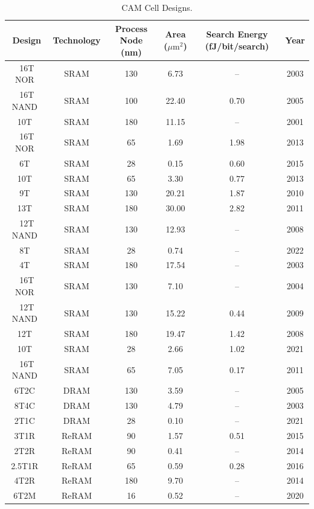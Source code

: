\begin{table}[t]
\small
\caption{CAM Cell Designs.}
\label{tab:cam_cell_designs}
\centering
\begin{tabular}{cccccc}
\hline
Design & Technology & Process Node (nm) & Area ($\mu\mathrm{m}^2$) & Search Energy (fJ/bit/search) & Year \\ \hline
16T NOR~\cite{SRAM_1} & SRAM & 130 & 6.73 & -- & 2003 \\
16T NAND~\cite{SRAM_2} & SRAM & 100 & 22.40 & 0.70 & 2005 \\
10T~\cite{SRAM_3} & SRAM & 180 & 11.15 & -- & 2001 \\
16T NOR~\cite{SRAM_4} & SRAM & 65 & 1.69 & 1.98 & 2013 \\
6T~\cite{SRAM_5} & SRAM & 28 & 0.15 & 0.60 & 2015 \\
10T~\cite{SRAM_6} & SRAM & 65 & 3.30 & 0.77 & 2013 \\
9T~\cite{SRAM_7} & SRAM & 130 & 20.21 & 1.87 & 2010 \\
13T~\cite{SRAM_8} & SRAM & 180 & 30.00 & 2.82 & 2011 \\
12T NAND~\cite{SRAM_9} & SRAM & 130 & 12.93 & -- & 2008 \\
8T~\cite{SRAM_10} & SRAM & 28 & 0.74 & -- & 2022 \\
4T~\cite{SRAM_11} & SRAM & 180 & 17.54 & -- & 2003 \\
16T NOR~\cite{SRAM_12} & SRAM & 130 & 7.10 & -- & 2004 \\
12T NAND~\cite{SRAM_13} & SRAM & 130 & 15.22 & 0.44 & 2009 \\
12T~\cite{SRAM_14} & SRAM & 180 & 19.47 & 1.42 & 2008 \\
10T~\cite{SRAM_15} & SRAM & 28 & 2.66 & 1.02 & 2021 \\
16T NAND~\cite{SRAM_18} & SRAM & 65 & 7.05 & 0.17 & 2011 \\
6T2C~\cite{DRAM_20} & DRAM & 130 & 3.59 & -- & 2005 \\
8T4C~\cite{DRAM_21} & DRAM & 130 & 4.79 & -- & 2003 \\
2T1C~\cite{DRAM_22} & DRAM & 28 & 0.10 & -- & 2021 \\
3T1R~\cite{ReRAM_1} & ReRAM & 90 & 1.57 & 0.51 & 2015 \\
2T2R~\cite{ReRAM_2} & ReRAM & 90 & 0.41 & -- & 2014 \\
2.5T1R~\cite{ReRAM_3} & ReRAM & 65 & 0.59 & 0.28 & 2016 \\
4T2R~\cite{ReRAM_4} & ReRAM & 180 & 9.70 & -- & 2014 \\
6T2M~\cite{ReRAM_5} & ReRAM & 16 & 0.52 & -- & 2020 \\

\end{tabular}
\end{table}
